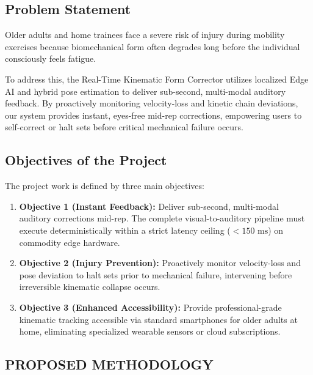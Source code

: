 \documentclass[12pt,a4paper]{report}
\begin{document}
\section{Problem Statement}
Older adults and home trainees face a severe risk of injury during mobility exercises because biomechanical form often degrades long before the individual consciously feels fatigue. 

To address this, the Real-Time Kinematic Form Corrector utilizes localized Edge AI and hybrid pose estimation to deliver sub-second, multi-modal auditory feedback. By proactively monitoring velocity-loss and kinetic chain deviations, our system provides instant, eyes-free mid-rep corrections, empowering users to self-correct or halt sets before critical mechanical failure occurs.

\section{Objectives of the Project}
The project work is defined by three main objectives:
\begin{enumerate}[label={(\arabic*)}]
    \item \textbf{Objective 1 (Instant Feedback):} Deliver sub-second, multi-modal auditory corrections mid-rep. The complete visual-to-auditory pipeline must execute deterministically within a strict latency ceiling ($< 150\text{ ms}$) on commodity edge hardware.
    \item \textbf{Objective 2 (Injury Prevention):} Proactively monitor velocity-loss and pose deviation to halt sets prior to mechanical failure, intervening before irreversible kinematic collapse occurs.
    \item \textbf{Objective 3 (Enhanced Accessibility):} Provide professional-grade kinematic tracking accessible via standard smartphones for older adults at home, eliminating specialized wearable sensors or cloud subscriptions.
\end{enumerate}
\null

\begin{center}
    \justifying
    \chapter{PROPOSED METHODOLOGY}
\end{center}
\end{document}
